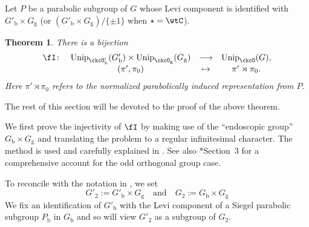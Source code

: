 \documentclass[12pt,a4paper]{amsart}
\numberwithin{equation}{section}
\newtheorem{thm}{Theorem}[section]
\theoremstyle{remark}
\def\Unip{\mathrm{Unip}}
\def\AND{\quad \text{and} \quad}
\def\Gb{G_{\mathrm b}}
\def\Gpb{G'_{\mathrm b}}
\def\Pb{P_{\mathrm b}}
\def\Gg{G_{\mathrm g}}
\begin{document}
Let $P$ be  a parabolic subgroup of $G$ whose Levi component is identified with $G'_{\mathrm b}\times G_{\mathrm g}$ (or $(G'_{\mathrm b}\times G_{\mathrm g})/\{\pm 1\}$ when $\star=\wtC$). 
\begin{thm}\label{thm:red}
  There is a bijection
  \begin{equation*}%
      \begin{array}{rccc}
    \fI\colon &   \Unip_{\ckcO'_{\mathrm b}}(G'_{\mathrm b})\times \Unip_{\ckcO_{\mathrm g}}(G_{\mathrm g})&         \longrightarrow &\Unip_{\ckcO}(G), \\
     &   (\pi',\pi_{0}) & \mapsto & \pi'\rtimes \pi_{0}.
      \end{array}
    \end{equation*}
    Here $\pi'\rtimes \pi_{0}$ refers to the normalized parabolically  induced representation from $P$.
  \end{thm}

%

\def\fhhaso{(\fhh^a_1)^*}
\def\fhhast{(\fhh^a_2)^*}
\newcommand{\ff}{f}
\newcommand{\ffcoh}{\varphi}

  The rest of this section will be devoted to the proof of the above theorem.

 We first prove the injectivity of $\fI$ by making use of the ``endoscopic group'' $\Gb\times \Gg$ and translating the problem to a regular infinitesimal
 character. The method is used and carefully explained in \cite{Mat}. See also
\cite{GI}*{Section~3} for a comprehensive account for the odd orthogonal group
case. %

To reconcile with the notation in \cite{GI}, we set
\[ G'_{2}:=\Gpb \times \Gg \AND
  G_{2} := G_{\mathrm b}\times G_{\mathrm g} %
\]
  We fix an identification of $\Gpb$ with the Levi component of a Siegel parabolic subgroup
  $\Pb$ in $\Gb$ and so will view $G'_{2}$ as a subgroup of $G_{2}$.
\end{document}
